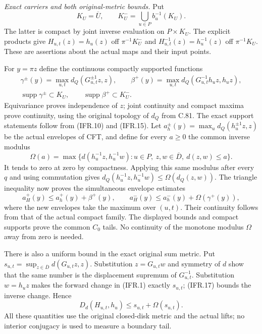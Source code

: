 \emph{Exact carriers and both original-metric bounds.}
Put
\[
 K_U=\overline U,\qquad
 K_U^- =\bigcup_{u\in P}b_u^{-1}(K_U).
                                                               \tag{IFR.15}
\]
The latter is compact by joint inverse evaluation on $P\times K_U$.
The explicit products give
$H_{u,t}(z)=h_u(z)$ off $\pi^{-1}K_U^-$ and
$H_{u,t}^{-1}(z)=h_u^{-1}(z)$ off $\pi^{-1}K_U$.
These are assertions about the actual maps and their input points.

For $y=\pi z$ define the continuous compactly supported functions
\[
\begin{gathered}
 \gamma^\pm(y)=\max_{u,t}d_Q(G_{u,t}^{\pm1}z,z),\qquad
 \beta^+(y)=\max_{u,t}d_Q(G_{u,t}^{-1}h_u z,h_u z),\\
 \operatorname{supp}\gamma^\pm\subset K_U,\qquad
 \operatorname{supp}\beta^+\subset K_U^-.
\end{gathered}                                                    \tag{IFR.16}
\]
Equivariance proves independence of $z$; joint continuity and compact
maxima prove continuity, using the original topology of $d_Q$ from C.81.
The exact support statements follow from (IFR.10) and (IFR.15).
Let $a_h^\pm(y)=\max_u d_Q(h_u^{\pm1}z,z)$ be the actual envelopes
of CFT, and define for every $a\geq0$ the common inverse modulus
\[
 \Omega(a)=\max\{d(h_u^{-1}z,h_u^{-1}w):u\in P,
                \ z,w\in\overline D,\ d(z,w)\leq a\}.
                                                               \tag{IFR.17}
\]
It tends to zero at zero by compactness. Applying this same modulus
after every $q$ and using commutation gives
$d_Q(h_u^{-1}z,h_u^{-1}w)\leq\Omega(d_Q(z,w))$.
The triangle inequality now proves the simultaneous envelope estimates
\[
 a_H^+(y)\leq a_h^+(y)+\beta^+(y),\qquad
 a_H^-(y)\leq a_h^-(y)+\Omega(\gamma^+(y)),
                                                               \tag{IFR.18}
\]
where the new envelopes take the maximum over $(u,t)$.
Their continuity follows from that of the actual compact family.
The displayed bounds and compact supports prove the common $C_0$ tails.
No continuity of the monotone modulus $\Omega$ away from zero is needed.

There is also a uniform bound in the exact original sum metric.
Put $s_{u,t}=\sup_{z\in\overline D}d(G_{u,t}z,z)$.
Substitution $z=G_{u,t}w$ and symmetry of $d$ show that the same
number is the displacement supremum of $G_{u,t}^{-1}$.
Substitution $w=h_u z$ makes the forward change in (IFR.1) exactly
$s_{u,t}$; (IFR.17) bounds the inverse change. Hence
\[
 D_d(H_{u,t},h_u)\leq s_{u,t}+\Omega(s_{u,t}).                    \tag{IFR.19}
\]
All these quantities use the original closed-disk metric and the
actual lifts; no interior conjugacy is used to measure a boundary tail.

